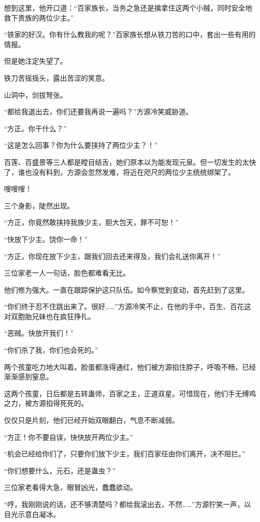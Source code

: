 \begin{this_body}
想到这里，他开口道：“百家族长，当务之急还是擒拿住这两个小贼，同时安全地救下贵族的两位少主。”

“铁家的好汉。你有什么教我的呢？”百家族长想从铁刀苦的口中，套出一些有用的情报。

但是她注定失望了。

铁刀苦摇摇头，露出苦涩的笑意。

山洞中，剑拔弩张。

“都给我退出去，你们还要我再说一遍吗？”方源冷笑威胁道。

“方正。你干什么？”

“这是怎么回事？你为什么要挟持了两位少主？！”

百莲、百盛景等三人都是瞠目结舌，她们原本以为能发现元泉。但一切发生的太快了，谁也没有料到，方源会忽然发难，将近在咫尺的两位少主统统绑架了。

嗖嗖嗖！

三个身影，陡然出现。

“方正，你竟然敢挟持我族少主，胆大包天，罪不可恕！”

“快放下少主。饶你一命！”

“方正，你现在放下少主，跟我们回去还来得及，我们会礼送你离开！”

三位家老一人一句话，脸色都难看无比。

他们修为强大。一直在跟踪保护这只队伍。如今察觉到变动，首先赶到了这里。

“你们终于忍不住跳出来了。很好……”方源冷笑不止，在他的手中，百生、百花这对双胞胎兄妹也在疯狂挣扎。

“恶贼。快放开我们！”

“你们杀了我，你们也会死的。”

两个孩童吃力地大叫着。脸蛋都涨得通红，他们被方源掐住脖子，呼吸不畅，已经渐渐感到窒息。

这两个孩童，日后都是五转蛊师，百家之主，正道双星。可惜现在，他们手无缚鸡之力，被方源掐得死死的。

仅仅只是片刻，他们已经开始双眼翻白，气息不断减弱。

“方正！你不要自误，快快放开两位少主。”

“机会已经给你们了，只要你们放下少主，我们百家任由你们离开，决不阻拦。”

“你们想要什么，元石，还是蛊虫？”

三位家老看得大急，眼冒凶光，蠢蠢欲动。

“哼，我刚刚说的话，还不够清楚吗？都给我滚出去，不然……”方源狞笑一声，以目光示意白凝冰。


\end{this_body}
